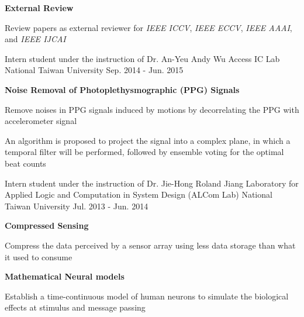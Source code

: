 \documentclass[12pt, a4paper]{awesome-cv}
\begin{document}
\begin{cventries}
{\begin{cvitems}
\begin{cvitems}
            \end{cvitems}
        \item{\bfseries External Review}
            \begin{cvitems}
            \item{Review papers as external reviewer for \emph{IEEE ICCV}, \emph{IEEE ECCV}, \emph{IEEE AAAI}, and \emph{IEEE IJCAI}}
            \end{cvitems}
        \end{cvitems}
    }
    \cventry
    {Intern student under the instruction of Dr. An-Yeu Andy Wu}
    {Access IC Lab}
    {National Taiwan University}
    {Sep. 2014 - Jun. 2015}
    {
        \begin{cvitems}
        \item{\bfseries Noise Removal of Photoplethysmographic (PPG) Signals}
            \begin{cvitems}
            \item{Remove noises in PPG signals induced by motions by decorrelating the PPG with accelerometer signal}
            \item{An algorithm is proposed to project the signal into a complex plane, in which a temporal filter will be performed, followed by ensemble voting for the optimal beat counts}
            \end{cvitems}
        \end{cvitems}
    }
    \cventry
    {Intern student under the instruction of Dr. Jie-Hong Roland Jiang}
    {Laboratory for Applied Logic and Computation in System Design (ALCom Lab)}
    {National Taiwan University}
    {Jul. 2013 - Jun. 2014}
    {
        \begin{cvitems}
        \item{\bfseries Compressed Sensing}
            \begin{cvitems}
            \item{Compress the data perceived by a sensor array using less data storage than what it used to consume}
            \end{cvitems}
        \item{\bfseries Mathematical Neural models}
            \begin{cvitems}
            \item{Establish a time-continuous model of human neurons to simulate the biological effects at stimulus and message passing}
            \end{cvitems}
        \end{cvitems}
    }
\end{cventries}
\vspace{-5mm}
\end{document}
